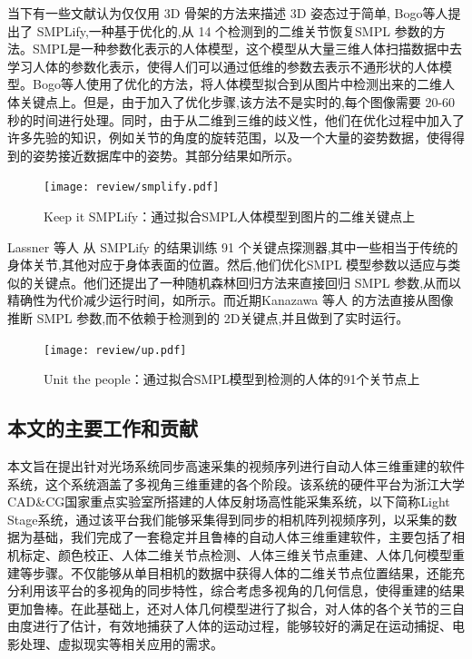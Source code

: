 当下有一些文献认为仅仅用 3D 骨架的方法来描述 3D 姿态过于简单, Bogo等人\autocite{bogo2016keep}提出了 SMPLify,一种基于优化的,从 14 个检测到的二维关节恢复SMPL 参数的方法。SMPL\autocite{loper2015smpl}是一种参数化表示的人体模型，这个模型从大量三维人体扫描数据中去学习人体的参数化表示，使得人们可以通过低维的参数去表示不通形状的人体模型。Bogo等人\autocite{bogo2016keep}使用了优化的方法，将人体模型拟合到从图片中检测出来的二维人体关键点上。但是，由于加入了优化步骤,该方法不是实时的,每个图像需要 20-60 秒的时间进行处理。同时，由于从二维到三维的歧义性，他们在优化过程中加入了许多先验的知识，例如关节的角度的旋转范围，以及一个大量的姿势数据，使得得到的姿势接近数据库中的姿势。其部分结果如所示。 

\begin{figure}[ht]
    \centering
    \texttt{[image: review/smplify.pdf]}
    \caption{Keep it SMPLify\autocite{bogo2016keep}：通过拟合SMPL人体模型到图片的二维关键点上}\label{fig:smpl1}
\end{figure}

Lassner \autocite{lassner2017unite} 等人 从 SMPLify 的结果训练 91 个关键点探测器,其中一些相当于传统的身体关节,其他对应于身体表面的位置。然后,他们优化SMPL 模型参数以适应与\autocite{bogo2016keep}类似的关键点。他们还提出了一种随机森林回归方法来直接回归 SMPL 参数,从而以精确性为代价减少运行时间，如所示。而近期Kanazawa 等人\autocite{kanazawa2018end} 的方法直接从图像推断 SMPL 参数,而不依赖于检测到的 2D关键点,并且做到了实时运行。

\begin{figure}[ht]
    \centering
    \texttt{[image: review/up.pdf]}
    \caption{Unit the people\autocite{lassner2017unite}：通过拟合SMPL模型到检测的人体的91个关节点上}\label{fig:up}
\end{figure}

\subsection{本文的主要工作和贡献}

本文旨在提出针对光场系统同步高速采集的视频序列进行自动人体三维重建的软件系统，这个系统涵盖了多视角三维重建的各个阶段。该系统的硬件平台为浙江大学CAD\&CG国家重点实验室所搭建的人体反射场高性能采集系统，以下简称Light Stage系统，通过该平台我们能够采集得到同步的相机阵列视频序列，以采集的数据为基础，我们完成了一套稳定并且鲁棒的自动人体三维重建软件，主要包括了相机标定、颜色校正、人体二维关节点检测、人体三维关节点重建、人体几何模型重建等步骤。不仅能够从单目相机的数据中获得人体的二维关节点位置结果，还能充分利用该平台的多视角的同步特性，综合考虑多视角的几何信息，使得重建的结果更加鲁棒。在此基础上，还对人体几何模型进行了拟合，对人体的各个关节的三自由度进行了估计，有效地捕获了人体的运动过程，能够较好的满足在运动捕捉、电影处理、虚拟现实等相关应用的需求。

